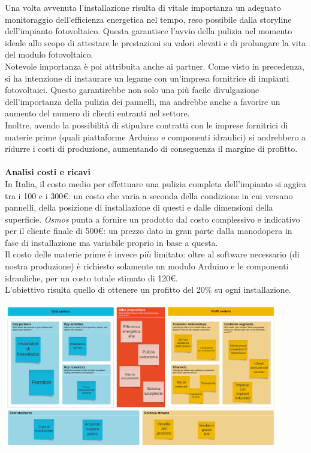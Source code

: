 \documentclass[a4paper, 12pt]{article}
\begin{document}
	Una volta avvenuta l'installazione risulta di vitale importanza un adeguato monitoraggio dell'efficienza energetica nel tempo, reso possibile dalla storyline dell'impianto fotovoltaico. Questa garantisce l'avvio della pulizia nel momento ideale allo scopo di attestare le prestazioni su valori elevati e di prolungare la vita del modulo fotovoltaico.\\
	Notevole importanza è poi attribuita anche ai partner. Come visto in precedenza, si ha intenzione di instaurare un legame con un'impresa fornitrice di impianti fotovoltaici. Questo garantirebbe non solo una più facile divulgazione dell'importanza della pulizia dei pannelli, ma andrebbe anche a favorire un aumento del numero di clienti entranti nel settore.\\ %
	Inoltre, avendo la possibilità di stipulare contratti con le imprese fornitrici di materie prime (quali piattaforme Arduino e componenti idraulici) si andrebbero a ridurre i costi di produzione, aumentando di conseguenza il margine di profitto.\\\\
	\textbf{Analisi costi e ricavi}\\
	In Italia, il costo medio per effettuare una pulizia completa dell'impianto si aggira tra i 100 e i 300\euro: un costo che varia a seconda della condizione in cui versano pannelli, della posizione di installazione di questi e dalle dimensioni della superficie. \emph{Osmos} punta a fornire un prodotto dal costo complessivo e indicativo per il cliente finale di 500\euro: un prezzo dato in gran parte dalla manodopera in fase di installazione ma variabile proprio in base a questa.\\
	Il costo delle materie prime è invece più limitato: oltre al software necessario (di nostra produzione) è richiesto solamente un modulo Arduino e le componenti idrauliche, per un costo totale stimato di 120\euro.\\
	L'obiettivo risulta quello di ottenere un profitto del 20\% su ogni installazione.
	\begin{center}
		\includegraphics[width=0.9\textwidth]{Images/BusinessModelCanvas.png}
	\end{center}
\end{document}
